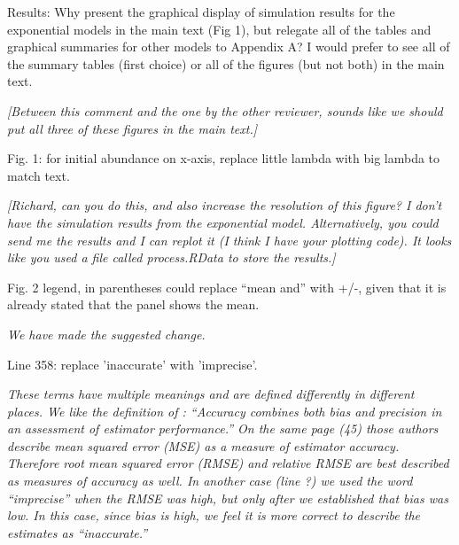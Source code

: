 \documentclass[12pt,english]{article}
\begin{document}
\begin{spacing}{1.9}
\begin{flushleft}
Results: Why present the graphical display of simulation results for the
exponential models in the main text (Fig 1), but relegate all of the tables and
graphical summaries for other models to Appendix A? I would prefer to see all of
the summary tables (first choice) or all of the figures (but not both) in the
main text.

\vspace{0.5cm}
\textit{[Between this comment and the one by the other reviewer, sounds like we should 
put all three of these figures in the main text.]}
\vspace{0.5cm}

Fig. 1: for initial abundance on x-axis, replace little lambda with big lambda
to match text.

\vspace{0.5cm}
\textit{[Richard, can you do this, and also increase the resolution of this figure?
I don't have the simulation results from the exponential model.  Alternatively,
you could send me the results and I can replot it (I think I have your plotting code).
It looks like you used a file called process.RData to store the results.]}
\vspace{0.5cm}

Fig. 2 legend, in parentheses could replace ``mean and'' with +/-, given that it
is already stated that the panel shows the mean.

\vspace{0.5cm}
\textit{We have made the suggested change.}
\vspace{0.5cm}

Line 358: replace 'inaccurate' with 'imprecise'.

\vspace{0.5cm}
\textit{These terms have multiple meanings and are defined differently in
different places.  We like the definition of \citet{williams_etal:2002}:
``Accuracy combines both bias and precision in an assessment of estimator
performance.''  On the same page (45) those authors describe mean squared error 
(MSE) as a measure of estimator accuracy.  Therefore root mean squared error (RMSE) and
relative RMSE are best described as measures of accuracy as well.  
In another case (line ?) we used the
word ``imprecise'' when the RMSE was high, but only after we established that
bias was low.  In this case, since bias is high, we feel it is more correct to describe
the estimates as ``inaccurate.''}
\vspace{0.5cm}


\end{flushleft}
\end{spacing}
\end{document}
